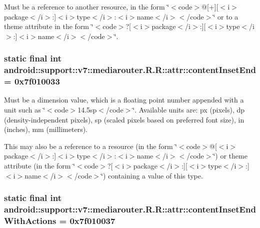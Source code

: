 Must be a reference to another resource, in the form \char`\"{}$<$code$>$@\mbox{[}+\mbox{]}\mbox{[}$<$i$>$package$<$/i$>$:\mbox{]}$<$i$>$type$<$/i$>$:$<$i$>$name$<$/i$>$$<$/code$>$\char`\"{} or to a theme attribute in the form \char`\"{}$<$code$>$?\mbox{[}$<$i$>$package$<$/i$>$:\mbox{]}\mbox{[}$<$i$>$type$<$/i$>$:\mbox{]}$<$i$>$name$<$/i$>$$<$/code$>$\char`\"{}. \hypertarget{classandroid_1_1support_1_1v7_1_1mediarouter_1_1_r_1_1attr_7d11627b7513d9c320adedea6364a207}{
\subsubsection[{contentInsetEnd}]{\setlength{\rightskip}{0pt plus 5cm}static final int android::support::v7::mediarouter.R.R::attr::contentInsetEnd = 0x7f010033}}
\label{classandroid_1_1support_1_1v7_1_1mediarouter_1_1_r_1_1attr_7d11627b7513d9c320adedea6364a207}


Must be a dimension value, which is a floating point number appended with a unit such as \char`\"{}$<$code$>$14.5sp$<$/code$>$\char`\"{}. Available units are: px (pixels), dp (density-independent pixels), sp (scaled pixels based on preferred font size), in (inches), mm (millimeters). 

This may also be a reference to a resource (in the form \char`\"{}$<$code$>$@\mbox{[}$<$i$>$package$<$/i$>$:\mbox{]}$<$i$>$type$<$/i$>$:$<$i$>$name$<$/i$>$$<$/code$>$\char`\"{}) or theme attribute (in the form \char`\"{}$<$code$>$?\mbox{[}$<$i$>$package$<$/i$>$:\mbox{]}\mbox{[}$<$i$>$type$<$/i$>$:\mbox{]}$<$i$>$name$<$/i$>$$<$/code$>$\char`\"{}) containing a value of this type. \hypertarget{classandroid_1_1support_1_1v7_1_1mediarouter_1_1_r_1_1attr_5e8dee28a8391e767f76e87a6f561bc3}{
\subsubsection[{contentInsetEndWithActions}]{\setlength{\rightskip}{0pt plus 5cm}static final int android::support::v7::mediarouter.R.R::attr::contentInsetEndWithActions = 0x7f010037}}
\label{classandroid_1_1support_1_1v7_1_1mediarouter_1_1_r_1_1attr_5e8dee28a8391e767f76e87a6f561bc3}


